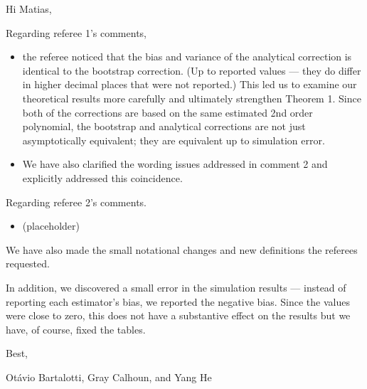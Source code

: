 \documentclass[12pt,fleqn]{article}
\begin{document}
\noindent%
Hi Matias,

\strut

Regarding referee 1's comments,
\begin{itemize}
\item the referee noticed that the bias and variance of the analytical
  correction is identical to the bootstrap correction. (Up to reported
  values --- they do differ in higher decimal places that were not
  reported.) This led us to examine our theoretical results more
  carefully and ultimately strengthen Theorem 1. Since both of the
  corrections are based on the same estimated 2nd order polynomial,
  the bootstrap and analytical corrections are not just asymptotically
  equivalent; they are equivalent up to simulation error.
\item We have also clarified the wording issues addressed in comment 2
  and explicitly addressed this coincidence.
\end{itemize}
Regarding referee 2's comments.
\begin{itemize}
\item (placeholder)
\end{itemize}
We have also made the small notational changes and new definitions
the referees requested.

In addition, we discovered a small error in the simulation results ---
instead of reporting each estimator's bias, we reported the negative
bias. Since the values were close to zero, this does not have a
substantive effect on the results but we have, of course, fixed the
tables.

\noindent%
Best,

\noindent%
Ot\'avio Bartalotti, Gray Calhoun, and Yang He
\end{document}
